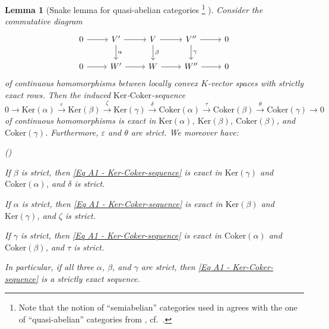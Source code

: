 \documentclass[a4paper, reqno, 10pt]{amsart}
\newtheorem{lemma}[theorem]{Lemma}
\theoremstyle{definition}
\newenvironment{altenumeratelevel2}
{\begin{list}
		{\textup{(\theenumi)} }
		{\usecounter{enumii}
			\setlength{\labelwidth}{2em}
			\setlength{\labelsep}{0pt}
			\setlength{\leftmargin}{2em}
			\setlength{\itemsep}{2pt}
			\setlength{\topsep}{2pt}
			\setlength{\itemindent}{0pt}
			\renewcommand{\theenumi}{\arabic{enumii}}
	}}
	{\end{list}}
\numberwithin{equation}{section}
\newcommand{\Coker}{{\mathrm{Coker}}}
\newcommand{\Ker}{{\mathrm{Ker}}}
\newcommand{\lra}{\longrightarrow}
\begin{document}
\begin{lemma}[{Snake lemma for quasi-abelian categories \cite{KopylovKuzminov00KerCokerSeqSemiAbCat}\footnote{Note that the notion of ``semiabelian'' categories used in \cite{KopylovKuzminov00KerCokerSeqSemiAbCat} agrees with the one of ``quasi-abelian'' categories from \cite{Schneiders98QuasiAbCat}, cf.\ \cite[p.\ 511]{KopylovKuzminov00KerCokerSeqSemiAbCat}.}
}]\label{Lemma A1 - Snake lemma}	
Consider the commutative diagram
\begin{equation*}
	\begin{tikzcd}
		0 \ar[r] &V' \ar[r] \ar[d, "\alpha"] &V \ar[r] \ar[d, "\beta"] &V'' \ar[r] \ar[d,"\gamma"] & 0 \\
		0 \ar[r] &W' \ar[r]					&W \ar[r] 					&W'' \ar[r] 			& 0
	\end{tikzcd}
\end{equation*}
of continuous homomorphisms between locally convex $K$-vector spaces with strictly exact rows.
Then the induced $\Ker$-$\Coker$-sequence
\begin{equation}\label{Eq A1 - Ker-Coker-sequence}
	0 \lra \Ker(\alpha) \overset{\varepsilon}{\lra} \Ker(\beta) \overset{\zeta}{\lra} \Ker(\gamma) \overset{\delta}{\lra} \Coker(\alpha) \overset{\tau}{\lra} \Coker(\beta) \overset{\theta}{\lra} \Coker(\gamma) \lra 0 
\end{equation}
of continuous homomorphisms is exact in $\Ker(\alpha)$, $\Ker(\beta)$, $\Coker(\beta)$, and $\Coker(\gamma)$.
Furthermore, $\varepsilon$ and $\theta$ are strict.
We moreover have:
\begin{altenumeratelevel2}
	\item
	If $\beta$ is strict, then \eqref{Eq A1 - Ker-Coker-sequence} is exact in $\Ker(\gamma)$ and $\Coker(\alpha)$, and $\delta$ is strict.
	\item
	If $\alpha$ is strict, then \eqref{Eq A1 - Ker-Coker-sequence} is exact in $\Ker(\beta)$ and $\Ker(\gamma)$, and $\zeta$ is strict.
	\item
	If $\gamma$ is strict, then \eqref{Eq A1 - Ker-Coker-sequence} is exact in $\Coker(\alpha)$ and $\Coker(\beta)$, and $\tau$ is strict.
\end{altenumeratelevel2}
In particular, if all three $\alpha$, $\beta$, and $\gamma$ are strict, then \eqref{Eq A1 - Ker-Coker-sequence} is a strictly exact sequence.
\end{lemma}
\end{document}
